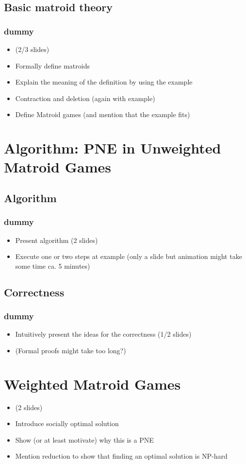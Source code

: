 \documentclass{beamer}
\newcommand{\ft}{\frametitle{dummy}}
\begin{document}
\subsection{Basic matroid theory}
\begin{frame}
  \ft
  \begin{itemize}
    \item (2/3 slides)
    \item Formally define matroids
    \item Explain the meaning of the definition by using the example
    \item Contraction and deletion (again with example)
    \item Define Matroid games (and mention that the example fits)
  \end{itemize}
\end{frame}

\section{Algorithm: PNE in Unweighted Matroid Games}
\subsection{Algorithm}
\begin{frame}
  \ft
  \begin{itemize}
    \item Present algorithm (2 slides)
    \item Execute one or two steps at example (only a slide but animation might
      take some time ca. 5 minutes)
  \end{itemize}
\end{frame}

\subsection{Correctness}
\begin{frame}
  \ft
  \begin{itemize}
    \item Intuitively present the ideas for the correctness (1/2 slides)
    \item (Formal proofs might take too long?)
  \end{itemize}
\end{frame}

\section{Weighted Matroid Games}
\begin{frame}
  \begin{itemize}
    \item (2 slides)
    \item Introduce socially optimal solution
    \item Show (or at least motivate) why this is a PNE
    \item Mention reduction to show that finding an optimal solution is NP-hard
  \end{itemize}
\end{frame}
\end{document}
